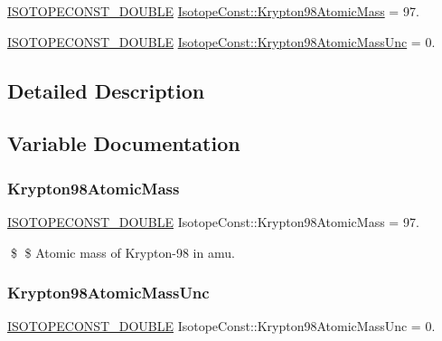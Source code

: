 \begin{DoxyCompactItemize}
\item 
\mbox{\hyperlink{group___isotope_const-_macros_ga8f45a7272ce02c0b4c65c44636ed719a}{I\+S\+O\+T\+O\+P\+E\+C\+O\+N\+S\+T\+\_\+\+D\+O\+U\+B\+LE}} \mbox{\hyperlink{group___isotope_const-_krypton-_kr98_gabadc2260cccd63995f77c9240193e323}{Isotope\+Const\+::\+Krypton98\+Atomic\+Mass}} = 97.
\item 
\mbox{\hyperlink{group___isotope_const-_macros_ga8f45a7272ce02c0b4c65c44636ed719a}{I\+S\+O\+T\+O\+P\+E\+C\+O\+N\+S\+T\+\_\+\+D\+O\+U\+B\+LE}} \mbox{\hyperlink{group___isotope_const-_krypton-_kr98_gacc961a2f857b0cdc73882ba0c56fb142}{Isotope\+Const\+::\+Krypton98\+Atomic\+Mass\+Unc}} = 0.
\end{DoxyCompactItemize}


\subsection{Detailed Description}


\subsection{Variable Documentation}
\mbox{\label{group___isotope_const-_krypton-_kr98_gabadc2260cccd63995f77c9240193e323}} 
\subsubsection{\texorpdfstring{Krypton98\+Atomic\+Mass}{Krypton98AtomicMass}}
{\footnotesize\ttfamily \mbox{\hyperlink{group___isotope_const-_macros_ga8f45a7272ce02c0b4c65c44636ed719a}{I\+S\+O\+T\+O\+P\+E\+C\+O\+N\+S\+T\+\_\+\+D\+O\+U\+B\+LE}} Isotope\+Const\+::\+Krypton98\+Atomic\+Mass = 97.}

\$ \$ Atomic mass of Krypton-\/98 in amu. \mbox{\label{group___isotope_const-_krypton-_kr98_gacc961a2f857b0cdc73882ba0c56fb142}} 
\subsubsection{\texorpdfstring{Krypton98\+Atomic\+Mass\+Unc}{Krypton98AtomicMassUnc}}
{\footnotesize\ttfamily \mbox{\hyperlink{group___isotope_const-_macros_ga8f45a7272ce02c0b4c65c44636ed719a}{I\+S\+O\+T\+O\+P\+E\+C\+O\+N\+S\+T\+\_\+\+D\+O\+U\+B\+LE}} Isotope\+Const\+::\+Krypton98\+Atomic\+Mass\+Unc = 0.}

